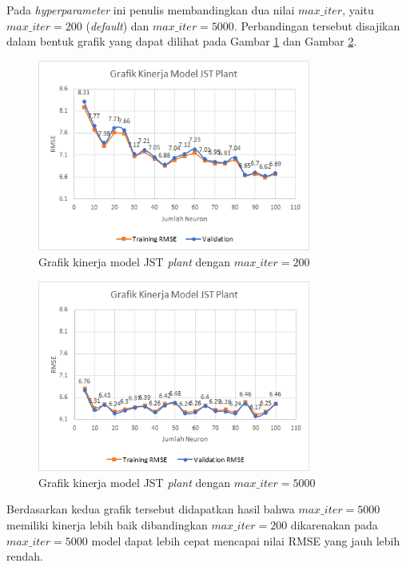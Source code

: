 Pada \textit{hyperparameter} ini penulis membandingkan dua nilai $max\_iter$, yaitu $max\_iter = 200$ (\textit{default}) dan $max\_iter = 5000$. Perbandingan tersebut disajikan dalam bentuk grafik yang dapat dilihat pada Gambar \ref{fig:5:MaxIter200} dan Gambar \ref{fig:5:MaxIter5000}. \\

\begin{figure}[h]
	\centering
	\includegraphics[width=0.8\textwidth]{figures/maxiter200}
	\caption{Grafik kinerja model JST \textit{plant} dengan $max\_iter = 200$}
	\label{fig:5:MaxIter200}
\end{figure}

\begin{figure}[!h]
	\centering
	\includegraphics[width=0.8\textwidth]{figures/maxiter5000}
	\caption{Grafik kinerja model JST \textit{plant} dengan $max\_iter = 5000$}
	\label{fig:5:MaxIter5000}
\end{figure}

Berdasarkan kedua grafik tersebut didapatkan hasil bahwa $max\_iter = 5000$ memiliki kinerja lebih baik dibandingkan $max\_iter = 200$ dikarenakan pada $max\_iter = 5000$ model dapat lebih cepat mencapai nilai RMSE yang jauh lebih rendah. \\

